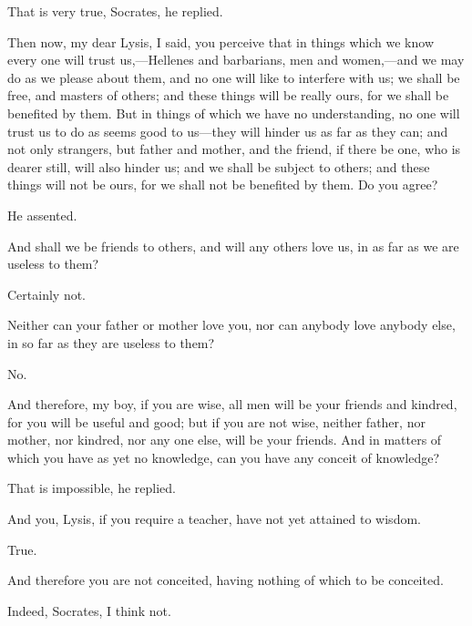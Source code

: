 \documentclass[11pt,letter]{article}
\begin{document}
\par  That is very true, Socrates, he replied.

\par  Then now, my dear Lysis, I said, you perceive that in things which we know every one will trust us,—Hellenes and barbarians, men and women,—and we may do as we please about them, and no one will like to interfere with us; we shall be free, and masters of others; and these things will be really ours, for we shall be benefited by them. But in things of which we have no understanding, no one will trust us to do as seems good to us—they will hinder us as far as they can; and not only strangers, but father and mother, and the friend, if there be one, who is dearer still, will also hinder us; and we shall be subject to others; and these things will not be ours, for we shall not be benefited by them. Do you agree?

\par  He assented.

\par  And shall we be friends to others, and will any others love us, in as far as we are useless to them?

\par  Certainly not.

\par  Neither can your father or mother love you, nor can anybody love anybody else, in so far as they are useless to them?

\par  No.

\par  And therefore, my boy, if you are wise, all men will be your friends and kindred, for you will be useful and good; but if you are not wise, neither father, nor mother, nor kindred, nor any one else, will be your friends. And in matters of which you have as yet no knowledge, can you have any conceit of knowledge?

\par  That is impossible, he replied.

\par  And you, Lysis, if you require a teacher, have not yet attained to wisdom.

\par  True.

\par  And therefore you are not conceited, having nothing of which to be conceited.

\par  Indeed, Socrates, I think not.
\end{document}
